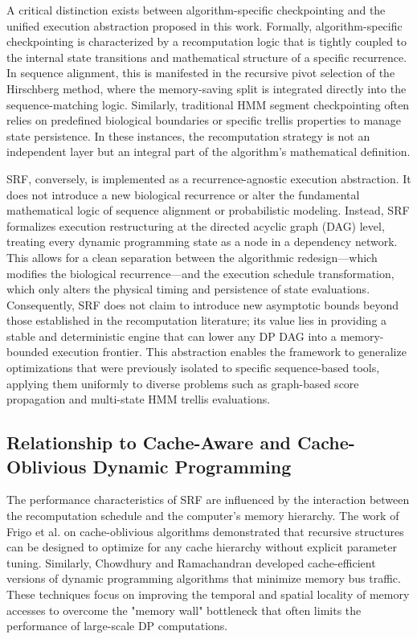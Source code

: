 A critical distinction exists between algorithm-specific checkpointing and the unified execution abstraction proposed in this work. Formally, algorithm-specific checkpointing is characterized by a recomputation logic that is tightly coupled to the internal state transitions and mathematical structure of a specific recurrence. In sequence alignment, this is manifested in the recursive pivot selection of the Hirschberg method, where the memory-saving split is integrated directly into the sequence-matching logic. Similarly, traditional HMM segment checkpointing often relies on predefined biological boundaries or specific trellis properties to manage state persistence. In these instances, the recomputation strategy is not an independent layer but an integral part of the algorithm's mathematical definition.

SRF, conversely, is implemented as a recurrence-agnostic execution abstraction. It does not introduce a new biological recurrence or alter the fundamental mathematical logic of sequence alignment or probabilistic modeling. Instead, SRF formalizes execution restructuring at the directed acyclic graph (DAG) level, treating every dynamic programming state as a node in a dependency network. This allows for a clean separation between the algorithmic redesign---which modifies the biological recurrence---and the execution schedule transformation, which only alters the physical timing and persistence of state evaluations. Consequently, SRF does not claim to introduce new asymptotic bounds beyond those established in the recomputation literature; its value lies in providing a stable and deterministic engine that can lower any DP DAG into a memory-bounded execution frontier. This abstraction enables the framework to generalize optimizations that were previously isolated to specific sequence-based tools, applying them uniformly to diverse problems such as graph-based score propagation and multi-state HMM trellis evaluations.

\subsection{Relationship to Cache-Aware and Cache-Oblivious Dynamic Programming}

The performance characteristics of SRF are influenced by the interaction between the recomputation schedule and the computer's memory hierarchy. The work of Frigo et al. \cite{Frigo1999} on cache-oblivious algorithms demonstrated that recursive structures can be designed to optimize for any cache hierarchy without explicit parameter tuning. Similarly, Chowdhury and Ramachandran \cite{Chowdhury2006} developed cache-efficient versions of dynamic programming algorithms that minimize memory bus traffic. These techniques focus on improving the temporal and spatial locality of memory accesses to overcome the "memory wall" bottleneck that often limits the performance of large-scale DP computations.

